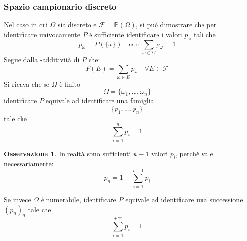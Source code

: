 \documentclass{article}
\theoremstyle{plain}
\theoremstyle{definition}
\newtheorem{osservazione}{Osservazione}[section]
\theoremstyle{remark}
\begin{document}
\subsubsection{Spazio campionario discreto} %
\label{subs:spazio_campionario_discreto}
Nel caso in cui $\Omega$ sia discreto e $\mathscr{F}=\mathds{P}(\Omega)$, si può dimostrare che per identificare univocamente $P$ è sufficiente identificare i valori $p_\omega$ tali che
\begin{equation*}
	p_\omega=P(\{\omega\})\quad\text{con }\sum_{\omega\in\Omega}p_\omega=1
\end{equation*}
Segue dalla \sigma-additività di $P$ che:
\begin{equation*}
	P(E)=\sum_{\omega\in E} p_\omega\quad\forall E\in\mathscr{F}
\end{equation*}
Si ricava che se $\Omega$ è finito
\begin{equation*}
	\Omega=\{\omega_1,...,\omega_n\}
\end{equation*}
identificare $P$ equivale ad identificare una famiglia
\begin{equation*}
	\{p_1,...,p_n\}
\end{equation*}
tale che 
\begin{equation*}
	\sum_{i=1}^n p_i=1
\end{equation*}
\begin{osservazione}
	In realtà sono sufficienti $n-1$ valori $p_i$, perchè vale necessariamente:
	\begin{equation*}
		p_n=1-\sum_{i=1}^{n-1}p_i
	\end{equation*}
\end{osservazione}
Se invece $\Omega$ è numerabile, identificare $P$ equivale ad identificare una successione $(p_n)_n$ tale che
\begin{equation*}
	\sum_{i=1}^{+\infty}p_i=1
\end{equation*}
\end{document}
